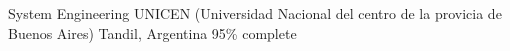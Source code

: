 \begin{cventries}
\cventry
{System Engineering} %
{UNICEN (Universidad Nacional del centro de la provicia de Buenos Aires)} %
{Tandil, Argentina} %
{ 95\% complete} %
{ %
}
\end{cventries}
